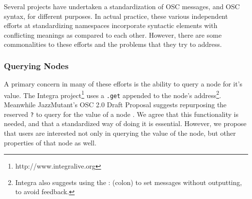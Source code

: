 \documentclass{NIME-alternate}
\begin{document}


Several projects have undertaken a standardization of OSC messages, and OSC syntax, for different purposes. In actual practice, these various independent efforts at standardizing namespaces incorporate syntactic elements with conflicting meanings as compared to each other. However, there are some commonalities to these efforts and the problems that they try to address.

\subsubsection{Querying Nodes}
A primary concern in many of these efforts is the ability to query a node for it's value. The Integra project\footnote{http://www.integralive.org} uses a \texttt{.get} appended to the node's address\footnote{Integra also suggests using the : (colon) to set messages without outputting, to avoid feedback.}. Meanwhile JazzMutant's OSC 2.0 Draft Proposal suggests repurposing the reserved \texttt{?} to query for the value of a node %
\cite{Jazzmutant:2007}. We agree that this functionality is needed, and that a standardized way of doing it is essential.  However, we propose that users are interested not only in querying the value of the node, but other properties of that node as well.
\end{document}
